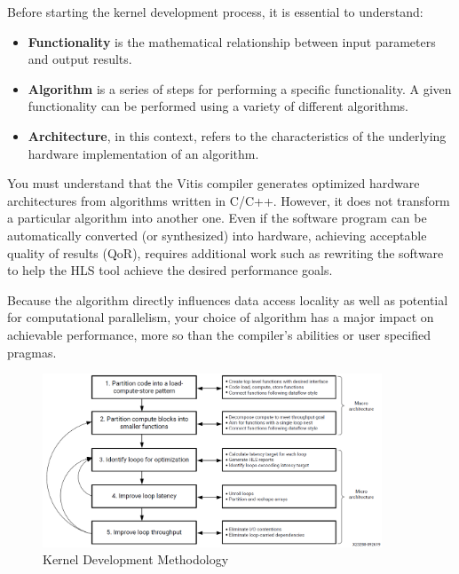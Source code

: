 Before starting the kernel development process, it is essential to understand:
\begin{itemize}
    \item \textbf{Functionality} is the mathematical relationship between input parameters and output results.
    \item \textbf{Algorithm} is a series of steps for performing a specific functionality. A given functionality can be performed using a variety of different algorithms.
    \item \textbf{Architecture}, in this context, refers to the characteristics of the underlying hardware implementation of an algorithm.
\end{itemize}

You must understand that the Vitis compiler generates optimized hardware architectures from algorithms written in C/C++. However, it does not transform a particular algorithm into another one. Even if the software program can be automatically converted (or synthesized) into hardware,
achieving acceptable quality of results (QoR), requires additional work such as rewriting the software to help the HLS tool achieve the desired performance goals.

\begin{highlight}
    Because the algorithm directly influences data access locality as well as potential for computational parallelism, your choice of algorithm has a major impact on achievable performance, more so than the compiler's abilities or user specified pragmas. 
\end{highlight}


\begin{figure}[H]
    \begin{center}
        \includegraphics[width=0.9\textwidth]{images/KernelMethodology.PNG}
        \caption{Kernel Development Methodology}
        \label{KernelMethodology}
    \end{center}
\end{figure}

